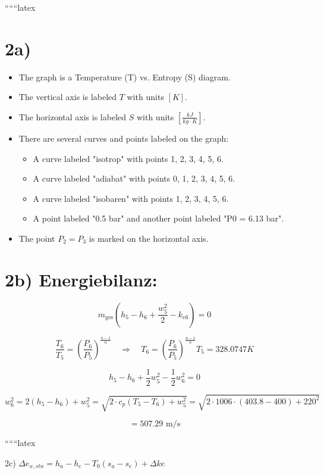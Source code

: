 
``````latex


\section*{2a)}

\begin{itemize}
    \item The graph is a Temperature (T) vs. Entropy (S) diagram.
    \item The vertical axis is labeled \( T \) with units \([K]\).
    \item The horizontal axis is labeled \( S \) with units \(\left[\frac{kJ}{kg \cdot K}\right]\).
    \item There are several curves and points labeled on the graph:
        \begin{itemize}
            \item A curve labeled "isotrop" with points 1, 2, 3, 4, 5, 6.
            \item A curve labeled "adiabat" with points 0, 1, 2, 3, 4, 5, 6.
            \item A curve labeled "isobaren" with points 1, 2, 3, 4, 5, 6.
            \item A point labeled "0.5 bar" and another point labeled "P0 = 6.13 bar".
        \end{itemize}
    \item The point \( P_2 = P_3 \) is marked on the horizontal axis.
\end{itemize}

\section*{2b) Energiebilanz:}

\[
m_{\text{ges}} \left( h_5 - h_6 + \frac{w_5^2}{2} - k_{e6} \right) = 0
\]

\[
\frac{T_6}{T_5} = \left( \frac{P_6}{P_5} \right)^{\frac{n-1}{n}} \quad \Rightarrow \quad T_6 = \left( \frac{P_6}{P_5} \right)^{\frac{n-1}{n}} T_5 = 328.0747 K
\]

\[
h_5 - h_6 + \frac{1}{2} w_5^2 - \frac{1}{2} w_6^2 = 0
\]

\[
w_6^2 = 2 \left( h_5 - h_6 \right) + w_5^2 = \sqrt{2 \cdot c_p \left( T_5 - T_6 \right) + w_5^2} = \sqrt{2 \cdot 1006 \cdot (403.8 - 400) + 220^2}
\]

\[
= 507.29 \text{ m/s}
\]

``````latex


2c) \(\Delta e_{x,stn} = h_a - h_e - T_0 (s_a - s_e) + \Delta ke\)

